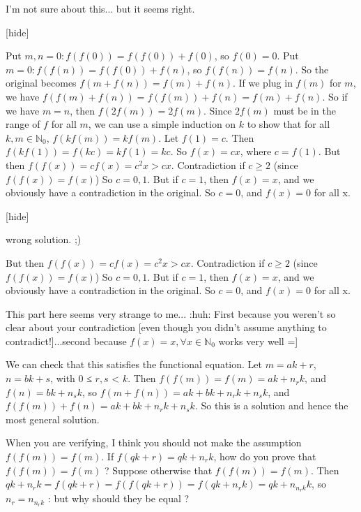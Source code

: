\begin{solution}
	\begin{tcolorbox}I'm not sure about this... but it seems right.

[hide]

Put $m,n=0: f(f(0)) = f(f(0)) + f(0)$, so $f(0) = 0$.
Put $m=0: f(f(n)) = f(f(0)) + f(n)$, so $f(f(n)) = f(n)$.
So the original becomes $f(m+f(n)) = f(m) + f(n)$.
If we plug in $f(m)$ for $m$, we have $f(f(m)+f(n)) = f(f(m)) + f(n) = f(m) + f(n)$.
So if we have $m=n$, then $f(2f(m)) = 2f(m)$.
Since $2f(m)$ must be in the range of $f$ for all $m$, we can use a simple induction on $k$ to show that for all $k,m \in \mathbb{N}_0$, $f(kf(m)) = kf(m)$.
Let $f(1)=c$. Then $f(kf(1)) = f(kc) = kf(1) = kc$.
So $f(x)=cx$, where $c=f(1)$.
But then $f(f(x)) = cf(x) = c^2x > cx$. Contradiction if $c \ge 2$ (since $f(f(x)) = f(x)$)
So $c=0,1$.
But if $c=1$, then $f(x)=x$, and we obviously have a contradiction in the original. So $c=0$, and $f(x)=0$ for all x.

[\/hide]\end{tcolorbox}

wrong solution.  ;)
\end{solution}



\begin{solution}
	\begin{tcolorbox}
But then $f(f(x)) = cf(x) = c^2x > cx$. Contradiction if $c \ge 2$ (since $f(f(x)) = f(x)$)
So $c=0,1$.
But if $c=1$, then $f(x)=x$, and we obviously have a contradiction in the original. So $c=0$, and $f(x)=0$ for all x.
\end{tcolorbox}

This part here seems very strange to me... :huh: 
First because you weren't so clear about your contradiction [even though you didn't assume anything to contradict!]...second because $f(x)=x, \forall x\in \mathbb{N}_0$ works very well =]
\end{solution}



\begin{solution}
	\begin{tcolorbox}
We can check that this satisfies the functional equation. 
Let $m = ak + r$, $n = bk + s$, with $0$ ≤ $r, s$ < $k$. 
Then $f(f(m)) = f(m) = ak + n_rk$, and $f(n) = bk + n_sk$, 
so $f(m + f(n)) = ak + bk + n_rk + n_sk$, and $f(f(m)) + f(n) = ak + bk + n_rk + n_sk$. 
So this is a solution and hence the most general solution.\end{tcolorbox}
When you are verifying, I think you should not make the assumption $f(f(m))=f(m)$.
If $f(qk+r)=qk + n_r k$, how do you prove that $f(f(m))=f(m)$ ?
Suppose otherwise that $f(f(m))=f(m)$. Then $qk+n_r k = f(qk+r) = f(f(qk+r))=f(qk+n_r k)=qk + n_{n_r k}k$, so  $n_r = n_{n_r k}$ : but why should they be equal ?
\end{solution}



